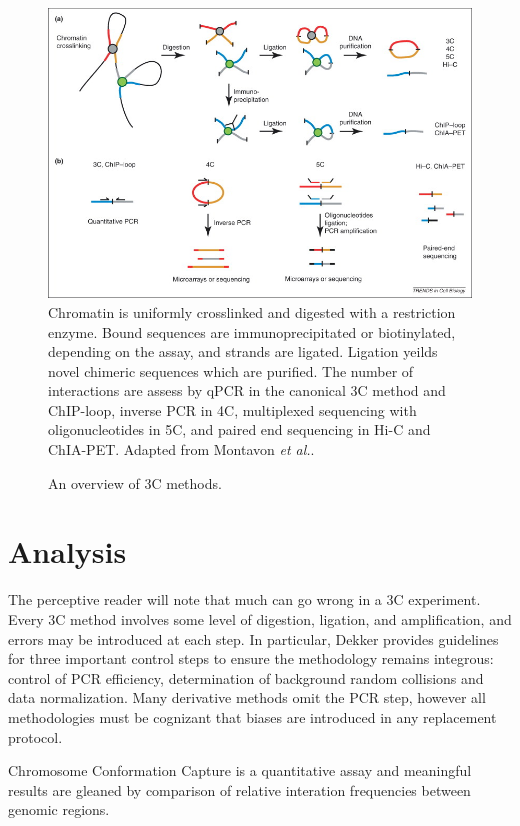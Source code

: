 \documentclass[phd,tocprelim]{cornell}
\begin{document}
\begin{figure}[b]
  \centering
  \caption{An overview of 3C methods.}
  \includegraphics[width=\textwidth]{figures/CompareChromosomeCapture}
  \medskip
  \small
  Chromatin is uniformly crosslinked and digested with a restriction enzyme.
  Bound sequences are immunoprecipitated or biotinylated, depending on the
  assay, and strands are ligated.  Ligation yeilds novel chimeric sequences
  which are purified.  The number of interactions are assess by qPCR in
  the canonical 3C method and ChIP-loop, inverse PCR in 4C, multiplexed
  sequencing with oligonucleotides in 5C, and paired end sequencing in Hi-C
  and ChIA-PET\@.  Adapted from Montavon \textit{et al.}\cite{montavon2012}.
\end{figure}



\section{Analysis}

The perceptive reader will note that much can go wrong in a 3C experiment.
Every 3C method involves some level of digestion, ligation, and amplification,
and errors may be introduced at each step.  In particular, Dekker provides
guidelines for three important control steps to ensure the methodology remains
integrous: control of PCR efficiency, determination of background random
collisions and data normalization\cite{dekker2006}.  Many derivative methods
omit the PCR step, however all methodologies must be cognizant that biases are
introduced in any replacement protocol.


Chromosome Conformation Capture is a quantitative assay and meaningful
results are gleaned by comparison of relative interation frequencies
between genomic regions.
\end{document}

